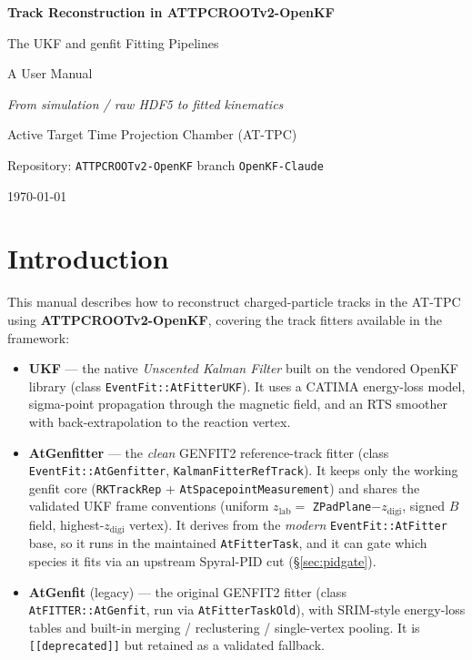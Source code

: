 \documentclass[11pt,a4paper]{article}
\newcommand{\code}[1]{\texttt{\small #1}}
\newcommand{\file}[1]{\texttt{\small #1}}
\begin{document}
\begin{titlepage}
\centering
\vspace*{2.5cm}
{\Huge\bfseries Track Reconstruction in ATTPCROOTv2-OpenKF\par}
\vspace{0.6cm}
{\LARGE The UKF and genfit Fitting Pipelines\par}
\vspace{1.2cm}
{\large A User Manual\par}
\vspace{2.0cm}
{\large\itshape From simulation / raw HDF5 to fitted kinematics\par}
\vfill
{\large Active Target Time Projection Chamber (AT-TPC)\par}
\vspace{0.4cm}
{\normalsize Repository: \file{ATTPCROOTv2-OpenKF} \quad branch \file{OpenKF-Claude}\par}
\vspace{0.4cm}
{\normalsize \today\par}
\end{titlepage}

\tableofcontents
\newpage

\section{Introduction}

This manual describes how to reconstruct charged-particle tracks in the AT-TPC
using \textbf{ATTPCROOTv2-OpenKF}, covering the track fitters available in the
framework:

\begin{itemize}[nosep]
  \item \textbf{UKF} --- the native \emph{Unscented Kalman Filter} built on the
  vendored OpenKF library (class \code{EventFit::AtFitterUKF}). It uses a CATIMA
  energy-loss model, sigma-point propagation through the magnetic field, and an
  RTS smoother with back-extrapolation to the reaction vertex.
  \item \textbf{AtGenfitter} --- the \emph{clean} GENFIT2 reference-track fitter
  (class \code{EventFit::\allowbreak AtGenfitter}, \code{KalmanFitterRefTrack}). It keeps only
  the working genfit core (\code{RKTrackRep} + \code{AtSpacepointMeasurement}) and
  shares the validated UKF frame conventions (uniform $z_\mathrm{lab}=$
  \code{ZPadPlane}$-z_\mathrm{digi}$, signed $B$ field, highest-$z_\mathrm{digi}$
  vertex). It derives from the \emph{modern} \code{EventFit::\allowbreak AtFitter} base, so it
  runs in the maintained \code{AtFitterTask}, and it can gate which species it
  fits via an upstream Spyral-PID cut (\S\ref{sec:pidgate}).
  \item \textbf{AtGenfit} (legacy) --- the original GENFIT2 fitter
  (class \code{AtFITTER::AtGenfit}, run via \code{AtFitterTaskOld}), with SRIM-style
  energy-loss tables and built-in merging / reclustering / single-vertex pooling.
  It is \code{[[deprecated]]} but retained as a validated fallback.
\end{itemize}
\end{document}

